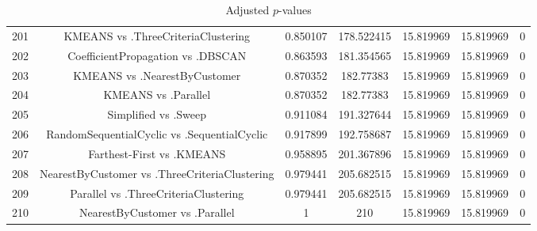 \documentclass[a4paper,10pt]{article}
\begin{document}
\begin{landscape}
\begin{table}[!htp]
\begin{tabular}{ccccccc}
201&KMEANS vs .ThreeCriteriaClustering&0.850107&178.522415&15.819969&15.819969&0\\
202&CoefficientPropagation vs .DBSCAN&0.863593&181.354565&15.819969&15.819969&0\\
203&KMEANS vs .NearestByCustomer&0.870352&182.77383&15.819969&15.819969&0\\
204&KMEANS vs .Parallel&0.870352&182.77383&15.819969&15.819969&0\\
205&Simplified vs .Sweep&0.911084&191.327644&15.819969&15.819969&0\\
206&RandomSequentialCyclic vs .SequentialCyclic&0.917899&192.758687&15.819969&15.819969&0\\
207&Farthest-First vs .KMEANS&0.958895&201.367896&15.819969&15.819969&0\\
208&NearestByCustomer vs .ThreeCriteriaClustering&0.979441&205.682515&15.819969&15.819969&0\\
209&Parallel vs .ThreeCriteriaClustering&0.979441&205.682515&15.819969&15.819969&0\\
210&NearestByCustomer vs .Parallel&1&210&15.819969&15.819969&0\\
\hline
\end{tabular}
\caption{Adjusted $p$-values}
\end{table}

\end{landscape}
\end{document}

